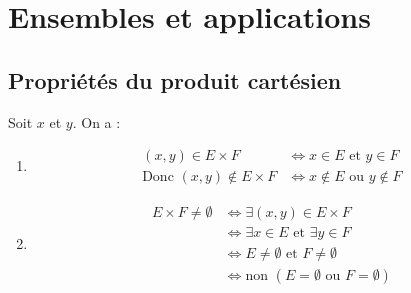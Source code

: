 \documentclass[../main.tex]{subfiles}
\begin{document}
\setcounter{chapter}{2}
\chapter{Ensembles et applications}
\tableofcontents
\clearpage

\setcounter{section}{11}
\section{Propriétés du produit cartésien}
Soit $x$ et $y$. On a :
\begin{enumerate}
    \item 
    \begin{align*}
        (x, y) \in E \times F &\Leftrightarrow x \in E \text{ et } y \in F \\ 
        \text{Donc } (x, y) \not \in E \times F &\Leftrightarrow x \not \in E \text{ ou } y \not \in F
    \end{align*}

    \item 
    \begin{align*}
        E \times F \not = \emptyset &\Leftrightarrow \exists (x, y) \in E \times F \\ 
        &\Leftrightarrow \exists x \in E \text{ et } \exists y \in F \\ 
        &\Leftrightarrow E \not = \emptyset \text{ et } F \not = \emptyset \\ 
        &\Leftrightarrow \text{non } (E = \emptyset \text{ ou } F = \emptyset)
    \end{align*}


\end{enumerate}
\end{document}
